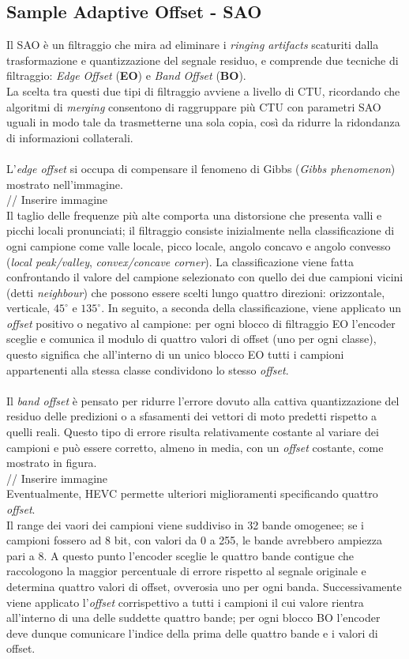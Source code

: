 \subsection{Sample Adaptive Offset - SAO}
Il SAO è un filtraggio che mira ad eliminare i \emph{ringing artifacts} 
scaturiti dalla trasformazione e quantizzazione del segnale residuo, e 
comprende due tecniche di filtraggio: \emph{Edge Offset} (\textbf{EO}) e 
\emph{Band Offset} (\textbf{BO}).\\
La scelta tra questi due tipi di filtraggio avviene a livello di CTU, ricordando
che  algoritmi di \emph{merging} consentono di raggruppare più CTU con parametri
SAO uguali in modo tale da trasmetterne una sola copia, così da ridurre la 
ridondanza di informazioni collaterali.
\\ \\
L'\emph{edge offset} si occupa di compensare il fenomeno di Gibbs (\emph{Gibbs
phenomenon}) mostrato nell'immagine.
\\
// Inserire immagine
\\
Il taglio delle frequenze più alte comporta una distorsione che presenta valli e
picchi locali pronunciati; il filtraggio consiste inizialmente nella 
classificazione di ogni campione come valle locale, picco locale, angolo concavo
e angolo convesso (\emph{local peak/valley}, \emph{convex/concave corner}).
La classificazione viene fatta confrontando il valore del campione selezionato 
con quello dei due campioni vicini (detti \emph{neighbour}) che possono essere 
scelti lungo quattro direzioni: orizzontale, verticale, $45^{\circ}$ e 
$135^{\circ}$. In seguito, a seconda della classificazione, viene applicato un
\emph{offset} positivo o negativo al campione: per ogni blocco di filtraggio EO
l'encoder sceglie e comunica il modulo di quattro valori di offset (uno per ogni
classe), questo significa che all'interno di un unico blocco EO tutti i campioni
appartenenti alla stessa classe condividono lo stesso \emph{offset}.
\\ \\
Il \emph{band offset} è pensato per ridurre l'errore dovuto alla cattiva 
quantizzazione del residuo delle predizioni o a sfasamenti dei vettori di moto 
predetti rispetto a quelli reali. Questo tipo di errore risulta relativamente 
costante al variare dei campioni e può essere corretto, almeno in media, con un 
\emph{offset} costante, come mostrato in figura.
\\
// Inserire immagine
\\
Eventualmente, HEVC permette ulteriori miglioramenti specificando quattro 
\emph{offset}. \\
Il range dei vaori dei campioni viene suddiviso in 32 bande omogenee; se i 
campioni fossero ad 8 bit, con valori da 0 a 255, le bande avrebbero ampiezza 
pari a 8. A questo punto l'encoder sceglie le quattro bande contigue che 
raccologono la maggior percentuale di errore rispetto al segnale originale e 
determina quattro valori di offset, ovverosia uno per ogni banda. 
Successivamente viene applicato l'\emph{offset} corrispettivo a tutti i campioni
il cui valore rientra all'interno di una delle suddette quattro bande; per ogni 
blocco BO l'encoder deve dunque comunicare l'indice della prima delle quattro 
bande e i valori di offset.

